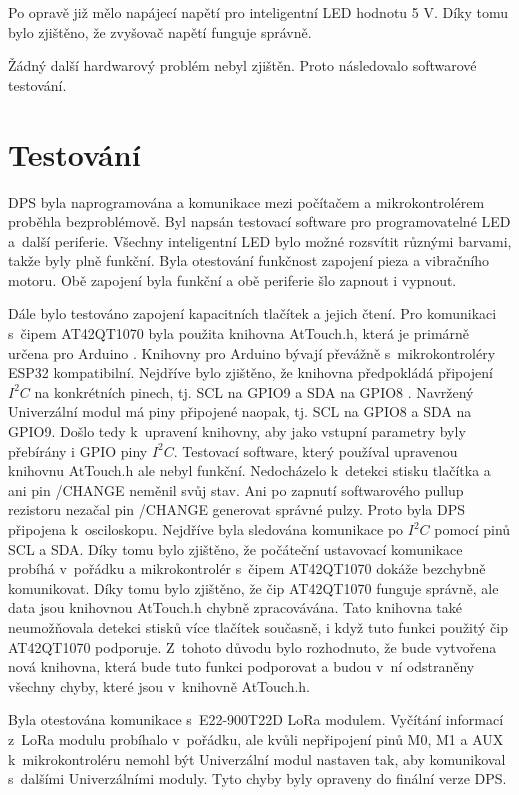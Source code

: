 Po opravě již mělo napájecí napětí pro inteligentní LED hodnotu 5 V. Díky tomu bylo zjištěno, že zvyšovač napětí funguje správně. 

Žádný další hardwarový problém nebyl zjištěn. Proto následovalo softwarové testování. 

\section{Testování}
DPS byla naprogramována a komunikace mezi počítačem a mikrokontrolérem proběhla bezproblémově. Byl napsán testovací software pro programovatelné LED 
a~další periferie. Všechny inteligentní LED bylo možné rozsvítit různými barvami, takže byly plně funkční. Byla otestování funkčnost 
zapojení pieza a vibračního motoru. Obě zapojení byla funkční a obě periferie šlo zapnout i vypnout. 

Dále bylo testováno zapojení kapacitních tlačítek a jejich čtení. Pro komunikaci s~čipem AT42QT1070 byla použita knihovna AtTouch.h, která je primárně určena pro Arduino \cite{AtTouch}. 
Knihovny pro Arduino bývají převážně s~mikrokontroléry ESP32 kompatibilní. Nejdříve bylo zjištěno, že knihovna předpokládá připojení $I^2C$ na konkrétních pinech, tj. SCL na GPIO9 a SDA 
na GPIO8 \cite{AtTouch}. Navržený Univerzální modul má piny připojené naopak, tj. SCL na GPIO8 a SDA na GPIO9. Došlo tedy k~upravení knihovny, aby jako vstupní parametry byly přebírány i GPIO 
piny $I^2C$. Testovací software, který používal upravenou knihovnu AtTouch.h ale nebyl funkční. Nedocházelo k~detekci stisku tlačítka a ani pin /CHANGE neměnil svůj stav. Ani po zapnutí 
softwarového pullup rezistoru nezačal pin /CHANGE generovat správné pulzy. Proto byla DPS 
připojena k~osciloskopu. Nejdříve byla sledována komunikace po $I^2C$ pomocí pinů SCL a SDA. Díky tomu bylo zjištěno, že počáteční ustavovací komunikace probíhá v~pořádku a mikrokontrolér 
s~čipem AT42QT1070 dokáže bezchybně komunikovat. Díky tomu bylo zjištěno, že čip AT42QT1070 funguje správně, ale data jsou knihovnou AtTouch.h chybně zpracovávána. Tato knihovna také neumožňovala detekci 
stisků více tlačítek současně, i když tuto funkci použitý čip AT42QT1070 podporuje. Z~tohoto důvodu bylo rozhodnuto, že bude vytvořena nová knihovna, která bude tuto funkci podporovat 
a budou v~ní odstraněny všechny chyby, které jsou v~knihovně AtTouch.h. 

Byla otestována komunikace s~E22-900T22D LoRa modulem. Vyčítání informací z~LoRa modulu probíhalo v~pořádku, ale kvůli nepřipojení pinů M0, M1 a AUX k~mikrokontroléru nemohl být Univerzální modul 
nastaven tak, aby komunikoval s~dalšími Univerzálními moduly. Tyto chyby byly opraveny do finální verze DPS.


